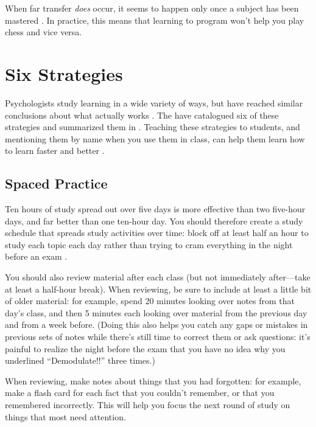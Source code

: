When far transfer \emph{does} occur, it seems to happen only once a subject
has been mastered \cite{Gick1987}. In practice, this means that
learning to program won't help you play chess and vice versa.

\section{Six Strategies}\label{s:individual-strategies}

Psychologists study learning in a wide variety of ways, but have
reached similar conclusions about what actually works
\cite{Mark2018}. The 
have catalogued six of these strategies and summarized them in . Teaching
these strategies to students, and mentioning them by name when you use
them in class, can help them learn how to learn faster and better
\cite{Wein2018a}.

\subsection{Spaced Practice}\label{spaced-practice}

Ten hours of study spread out over five days is more effective than two
five-hour days, and far better than one ten-hour day. You should
therefore create a study schedule that spreads study activities over
time: block off at least half an hour to study each topic each day
rather than trying to cram everything in the night before an exam
\cite{Kang2016}.

You should also review material after each class (but not immediately
after---take at least a half-hour break). When reviewing, be sure to
include at least a little bit of older material: for example, spend 20
minutes looking over notes from that day's class, and then 5 minutes
each looking over material from the previous day and from a week before.
(Doing this also helps you catch any gaps or mistakes in previous sets
of notes while there's still time to correct them or ask questions: it's
painful to realize the night before the exam that you have no idea why
you underlined ``Demodulate!!'' three times.)

When reviewing, make notes about things that you had forgotten: for
example, make a flash card for each fact that you couldn't remember, or
that you remembered incorrectly. This will help you focus the next round
of study on things that most need attention.

